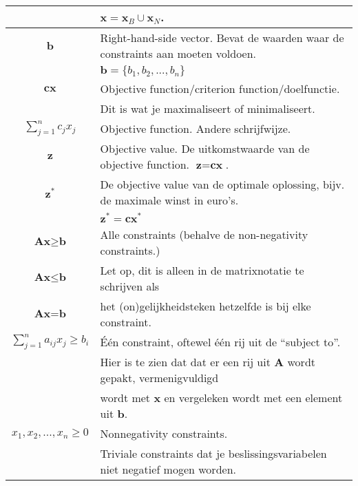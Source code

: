 \documentclass[10pt,a4paper]{article}
\begin{document}
\begin{tabular}{|c|l|}
 & $\textbf{x} = \textbf{x}_B \cup \textbf{x}_N$. \\
\hline
$\textbf{b}$ & Right-hand-side vector. Bevat de waarden waar de constraints aan moeten voldoen.\\
 & $\textbf{b} = \{b_1, b_2, ..., b_n\}$\\
\hline
$\textbf{cx}$ & Objective function/criterion function/doelfunctie. \\ & 	Dit is wat je maximaliseert of minimaliseert.\\
\hline
$\displaystyle\sum\limits_{j=1}^n c_jx_j$ & Objective function. Andere schrijfwijze. \\
\hline
$\textbf{z}$ & Objective value. De uitkomstwaarde van de objective function. $\textbf{z} = \textbf{cx}$.\\
\hline
$\textbf{z}^*$ & De objective value van de optimale oplossing, bijv. de maximale winst in euro's. \\ %
 & $\textbf{z}^* = \textbf{cx}^*$ \\
\hline
$\textbf{Ax} \geq \textbf{b}$ & Alle constraints (behalve de non-negativity constraints.)\\
$\textbf{Ax} \leq \textbf{b}$ & Let op, dit is alleen in de matrixnotatie te schrijven als \\
$\textbf{Ax} = \textbf{b}$ & het (on)gelijkheidsteken hetzelfde is bij elke constraint.\\
\hline
$\displaystyle\sum\limits_{j=1}^n a_{ij}x_j \ge b_i$ & Één constraint, oftewel één rij uit de ``subject to''.\\
 & Hier is te zien dat dat er een rij uit $\textbf{A}$ wordt gepakt, vermenigvuldigd \\ &  wordt met $\textbf{x}$ en vergeleken wordt met een element uit $\textbf{b}$. \\
\hline
$x_1, x_2, ..., x_n \geq 0$ & Nonnegativity constraints. \\ & Triviale constraints dat je beslissingsvariabelen niet negatief mogen worden.\\
\hline
\end{tabular}

\newpage
\end{document}
